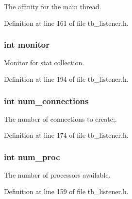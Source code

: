 The affinity for the main thread. 



Definition at line 161 of file tb\-\_\-listener.\-h.

\hypertarget{structtb__listener__t_a46fa1969de5714507943035793d36269}{
\subsubsection[{monitor}]{\setlength{\rightskip}{0pt plus 5cm}int monitor}}\label{structtb__listener__t_a46fa1969de5714507943035793d36269}


Monitor for stat collection. 



Definition at line 194 of file tb\-\_\-listener.\-h.

\hypertarget{structtb__listener__t_acbf48788378975ac1fb514027e3dc1ab}{
\subsubsection[{num\-\_\-connections}]{\setlength{\rightskip}{0pt plus 5cm}int num\-\_\-connections}}\label{structtb__listener__t_acbf48788378975ac1fb514027e3dc1ab}


The number of connections to create;. 



Definition at line 174 of file tb\-\_\-listener.\-h.

\hypertarget{structtb__listener__t_ae9a3e84ebf05ae6b7baf872b844c94ea}{
\subsubsection[{num\-\_\-proc}]{\setlength{\rightskip}{0pt plus 5cm}int num\-\_\-proc}}\label{structtb__listener__t_ae9a3e84ebf05ae6b7baf872b844c94ea}


The number of processors available. 



Definition at line 159 of file tb\-\_\-listener.\-h.

